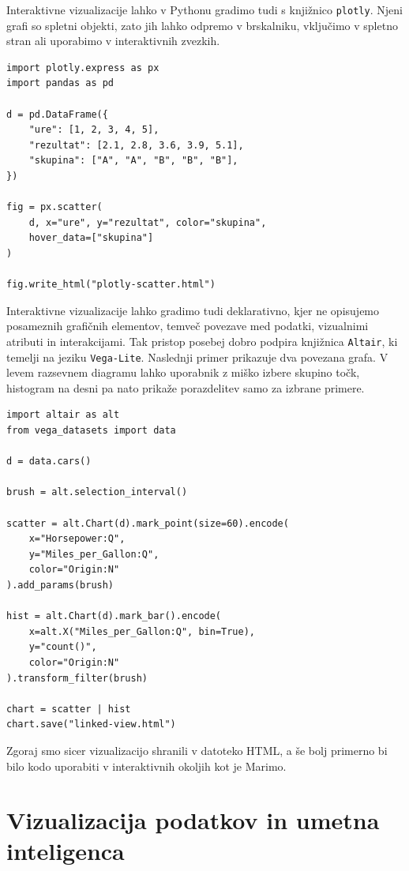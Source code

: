 Interaktivne vizualizacije lahko v Pythonu gradimo tudi s knjižnico
\texttt{plotly}. Njeni grafi so spletni objekti, zato jih lahko odpremo v
brskalniku, vključimo v spletno stran ali uporabimo v interaktivnih zvezkih.

\vspace*{3mm}
\begin{lstlisting}
import plotly.express as px
import pandas as pd

d = pd.DataFrame({
    "ure": [1, 2, 3, 4, 5],
    "rezultat": [2.1, 2.8, 3.6, 3.9, 5.1],
    "skupina": ["A", "A", "B", "B", "B"],
})

fig = px.scatter(
    d, x="ure", y="rezultat", color="skupina",
    hover_data=["skupina"]
)

fig.write_html("plotly-scatter.html")
\end{lstlisting}

Interaktivne vizualizacije lahko gradimo tudi deklarativno, kjer ne opisujemo
posameznih grafičnih elementov, temveč povezave med podatki, vizualnimi
atributi in interakcijami. Tak pristop posebej dobro podpira knjižnica
\texttt{Altair}, ki temelji na jeziku \texttt{Vega-Lite}. Naslednji primer prikazuje dva povezana grafa. V levem razsevnem diagramu lahko uporabnik z miško izbere skupino točk, histogram na desni pa nato prikaže porazdelitev samo za izbrane primere.
%
\vspace*{3mm}
\begin{lstlisting}
import altair as alt
from vega_datasets import data

d = data.cars()

brush = alt.selection_interval()

scatter = alt.Chart(d).mark_point(size=60).encode(
    x="Horsepower:Q",
    y="Miles_per_Gallon:Q",
    color="Origin:N"
).add_params(brush)

hist = alt.Chart(d).mark_bar().encode(
    x=alt.X("Miles_per_Gallon:Q", bin=True),
    y="count()",
    color="Origin:N"
).transform_filter(brush)

chart = scatter | hist
chart.save("linked-view.html")
\end{lstlisting}
% 
Zgoraj smo sicer vizualizacijo shranili v datoteko HTML, a še bolj primerno bi bilo kodo uporabiti v interaktivnih okoljih kot je Marimo.

\section{Vizualizacija podatkov in umetna inteligenca}

